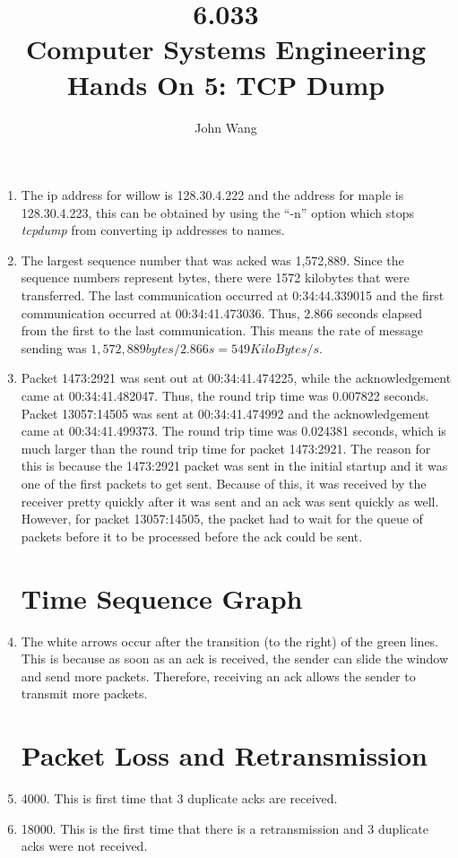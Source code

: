 \documentclass[psamsfonts]{amsart}
\title{6.033 \\
Computer Systems Engineering \\
Hands On 5: TCP Dump}
\author{John Wang}
\begin{document}
\maketitle

\begin{enumerate}
  \item The ip address for willow is 128.30.4.222 and the address for maple is 128.30.4.223, this can be obtained by using the ``-n'' option which stops \emph{tcpdump} from converting ip addresses to names.
  \item The largest sequence number that was acked was 1,572,889. Since the sequence numbers represent bytes, there were 1572 kilobytes that were transferred. The last communication occurred at 0:34:44.339015 and the first communication occurred at 00:34:41.473036. Thus, 2.866 seconds elapsed from the first to the last communication. This means the rate of message sending was $1,572,889 bytes / 2.866s = 549 KiloBytes/s$.
  \item Packet 1473:2921 was sent out at 00:34:41.474225, while the acknowledgement came at 00:34:41.482047. Thus, the round trip time was 0.007822 seconds. Packet 13057:14505 was sent at 00:34:41.474992 and the acknowledgement came at 00:34:41.499373. The round trip time was 0.024381 seconds, which is much larger than the round trip time for packet 1473:2921. The reason for this is because the 1473:2921 packet was sent in the initial startup and it was one of the first packets to get sent. Because of this, it was received by the receiver pretty quickly after it was sent and an ack was sent quickly as well. However, for packet 13057:14505, the packet had to wait for the queue of packets before it to be processed before the ack could be sent.

    \section{Time Sequence Graph}
  \item The white arrows occur after the transition (to the right) of the green lines. This is because as soon as an ack is received, the sender can slide the window and send more packets. Therefore, receiving an ack allows the sender to transmit more packets.

    \section{Packet Loss and Retransmission}
  \item 4000. This is first time that 3 duplicate acks are received.
  \item 18000. This is the first time that there is a retransmission and 3 duplicate acks were not received.


\end{enumerate}
\end{document}
